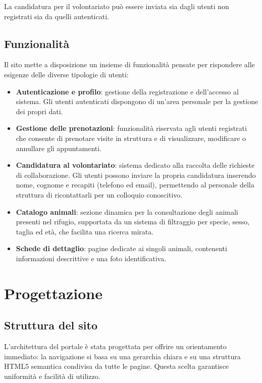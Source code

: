 \documentclass[10pt, letterpaper]{article}
\begin{document}
La candidatura per il volontariato può essere inviata sia dagli utenti non registrati sia da quelli autenticati.

\subsection{Funzionalità}
Il sito mette a disposizione un insieme di funzionalità pensate per rispondere alle esigenze delle diverse tipologie di utenti:
\begin{itemize}
    \item \textbf{Autenticazione e profilo}: gestione della registrazione e dell’accesso al sistema. Gli utenti autenticati dispongono di un’area personale per la gestione dei propri dati.
    \item \textbf{Gestione delle prenotazioni}: funzionalità riservata agli utenti registrati che consente di prenotare visite in struttura e di visualizzare, modificare o annullare gli appuntamenti.
    \item \textbf{Candidatura al volontariato}: sistema dedicato alla raccolta delle richieste di collaborazione. Gli utenti possono inviare la propria candidatura inserendo nome, cognome e recapiti (telefono ed email), permettendo al personale della struttura di ricontattarli per un colloquio conoscitivo.
    \item \textbf{Catalogo animali}: sezione dinamica per la consultazione degli animali presenti nel rifugio, supportata da un sistema di filtraggio per specie, sesso, taglia ed età, che facilita una ricerca mirata.
    \item \textbf{Schede di dettaglio}: pagine dedicate ai singoli animali, contenenti informazioni descrittive e una foto identificativa.
\end{itemize}

\section{Progettazione}
\subsection{Struttura del sito}
L’architettura del portale è stata progettata per offrire un orientamento immediato: la navigazione si basa su una gerarchia chiara e su una struttura HTML5 semantica condivisa da tutte le pagine.
Questa scelta garantisce uniformità e facilità di utilizzo.
\end{document}

